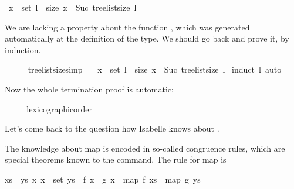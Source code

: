 \begin{isabellebody}
\begin{isamarkuptxt}
      \begin{isabelle}%
{}{\isachardot}\ x\ {\isasymin}\ set\ l\ {\isasymLongrightarrow}\ size\ x\ {\isacharless}\ Suc\ {\isacharparenleft}tree{\isacharunderscore}list{\isacharunderscore}size\ l{\isacharparenright}%
\end{isabelle} 

      We are lacking a property about the function , which was generated automatically at the
      definition of the  type. We should go back and prove
      it, by induction.%
\end{isamarkuptxt}%
\isamarkuptrue%
\ \ \ \ %
\endisatagproof
{\isafoldproof}%
%
\isadelimproof
%
\endisadelimproof
\isanewline
{}\isamarkupfalse%
\ tree{\isacharunderscore}list{\isacharunderscore}size{\isacharbrackleft}simp{\isacharbrackright}{\isacharcolon}\ \isanewline
\ \ {\isachardoublequoteopen}x\ {\isasymin}\ set\ l\ {\isasymLongrightarrow}\ size\ x\ {\isacharless}\ Suc\ {\isacharparenleft}tree{\isacharunderscore}list{\isacharunderscore}size\ l{\isacharparenright}{\isachardoublequoteclose}\isanewline
%
\isadelimproof
%
\endisadelimproof
%
\isatagproof
{}\isamarkupfalse%
\ {\isacharparenleft}induct\ l{\isacharparenright}\ auto%
\endisatagproof
{\isafoldproof}%
%
\isadelimproof
%
\endisadelimproof
%
\begin{isamarkuptext}%
Now the whole termination proof is automatic:%
\end{isamarkuptext}%
\isamarkuptrue%
\isamarkupfalse%
\ \isanewline
%
\isadelimproof
\ \ %
\endisadelimproof
%
\isatagproof
{}\isamarkupfalse%
\ lexicographic{\isacharunderscore}order%
\endisatagproof
{\isafoldproof}%
%
\isadelimproof
%
\endisadelimproof
%
\isamarkuptrue%
%
\begin{isamarkuptext}%
Let's come back to the question how Isabelle knows about .

  The knowledge about map is encoded in so-called congruence rules,
  which are special theorems known to the  command. The
  rule for map is

  \begin{isabelle}%
{\isasymlbrakk}{\isacharquery}xs\ {\isacharequal}\ {\isacharquery}ys{\isacharsemicolon}\ {\isasymAnd}x{\isachardot}\ x\ {\isasymin}\ set\ {\isacharquery}ys\ {\isasymLongrightarrow}\ {\isacharquery}f\ x\ {\isacharequal}\ {\isacharquery}g\ x{\isasymrbrakk}\ {\isasymLongrightarrow}\ map\ {\isacharquery}f\ {\isacharquery}xs\ {\isacharequal}\ map\ {\isacharquery}g\ {\isacharquery}ys%
\end{isabelle}


\end{isamarkuptext}
\end{isabellebody}
